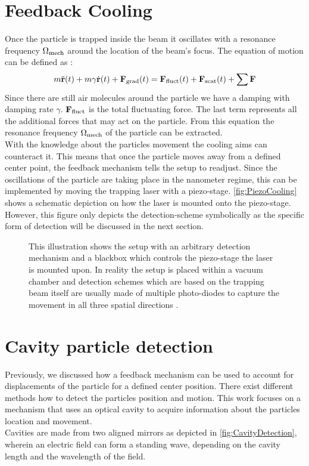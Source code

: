 \section{Feedback Cooling}
Once the particle is trapped inside the beam it oscillates with a resonance frequency $\de{\Omega}{mech}$ around the location of the beam's focus. The equation of motion can be defined as \cite[p.~24]{hebestreit2017thermal}:
\begin{equation}
	m\ddot{\vc{r}}(t)+m\gamma\dot{\vc{r}}(t)+\field{F}{grad}(t)=\field{F}{fluct}(t)+\field{F}{scat}(t)+\sum\limits\vc{F}
\end{equation}
Since there are still air molecules around the particle we have a damping with damping rate $\gamma$. $\field{F}{fluct}$ is the total fluctuating force. The last term represents all the additional forces that may act on the particle. From this equation the resonance frequency $\de{\Omega}{mech}$ of the particle can be extracted.\\
With the knowledge about the particles movement the cooling aims can counteract it. This means that once the particle moves away from a defined center point, the feedback mechanism tells the setup to readjust. Since the oscillations of the particle are taking place in the nanometer regime, this can be implemented by moving the trapping laser with a piezo-stage. \autoref{fig:PiezoCooling} shows a schematic depiction on how the laser is mounted onto the piezo-stage. However, this figure only depicts the detection-scheme symbolically as the specific form of detection will be discussed in the next section.
\begin{figure}[H]
    
    \caption{This illustration shows the setup with an arbitrary detection mechanism and a blackbox which controls the piezo-stage the laser is mounted upon. In reality the setup is placed within a vacuum chamber and detection schemes which are based on the trapping beam itself are usually made of multiple photo-diodes to capture the movement in all three spatial directions \cite[p.~43]{hebestreit2017thermal}.}
    \label{fig:PiezoCooling}
\end{figure}

\section{Cavity particle detection}\label{ChapCavityDetection}
Previously, we discussed how a feedback mechanism can be used to account for displacements of the particle for a defined center position. There exist different methods how to detect the particles position and motion. This work focuses on a mechanism that uses an optical cavity to acquire information about the particles location and movement.\\
Cavities are made from two aligned mirrors as depicted in \autoref{fig:CavityDetection}, wherein an electric field can form a standing wave, depending on the cavity length and the wavelength of the field.

